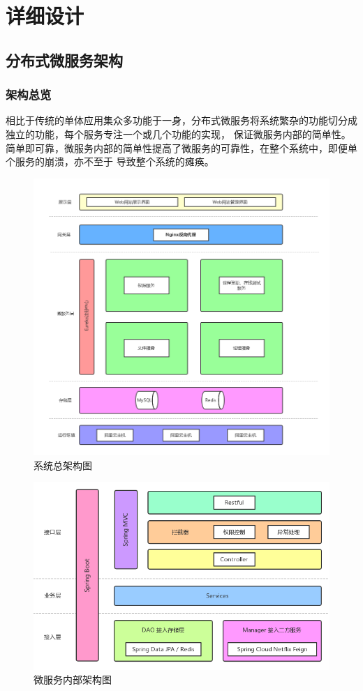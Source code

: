 \documentclass[titlepage,UTF8,linespread=1.5]{ctexart}
\begin{document}
\section{详细设计}
\subsection{分布式微服务架构}
\subsubsection{架构总览}
相比于传统的单体应用集众多功能于一身，分布式微服务将系统繁杂的功能切分成独立的功能，每个服务专注一个或几个功能的实现，
保证微服务内部的简单性。简单即可靠，微服务内部的简单性提高了微服务的可靠性，在整个系统中，即便单个服务的崩溃，亦不至于
导致整个系统的瘫痪。\par
\begin{figure}[H]
    \centering
    \includegraphics[width=150mm]{arch-overall.png}
    \caption{系统总架构图}
    \label{fig:arch-overall}
\end{figure}
\begin{figure}[H]
    \centering
    \includegraphics[width=150mm]{arch-microserver.png}
    \caption{微服务内部架构图}
    \label{fig:arch-microserver}
\end{figure}
\end{document}
